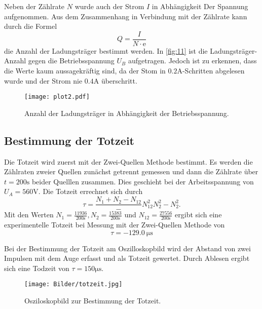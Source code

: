 \noindent Neben der Zählrate $N$ wurde auch der Strom $I$ in Abhängigkeit 
Der Spannung aufgenommen. Aus dem Zusammenhang in Verbindung 
mit der Zählrate kann durch die Formel 
\begin{equation}
    Q = \frac{I}{N \cdot \text{e}}
\end{equation}
die Anzahl der Ladungsträger bestimmt werden. In \autoref{fig:11} ist die 
Ladungsträger-Anzahl gegen die Betriebsspannung $U_B$ aufgetragen. Jedoch ist 
zu erkennen, dass die Werte kaum aussagekräftig sind, da der Stom 
in $0.2 \unit{\ampere}$-Schritten abgelesen wurde und der Strom 
nie $0.4 \unit{\ampere}$ überschritt.
\begin{figure}[H]
    \centering
    \caption{Anzahl der Ladungsträger in Abhängigkeit der Betriebsspannung.}
    \label{fig:11}
    \texttt{[image: plot2.pdf]}
\end{figure}

\subsection{Bestimmung der Totzeit}
Die Totzeit wird zuerst mit der Zwei-Quellen Methode bestimmt. Es 
werden die Zählraten zweier Quellen zunächst getrennt gemessen und 
dann die Zählrate über $t = 200 \unit{\second}$ beider Quelllen zusammen. Dies
geschieht bei der Arbeitsspannung von $U_A = 560 \unit{\volt}$. Die Totzeit
errechnet sich durch
\begin{equation}
    \tau = \frac{N_\text{1} + N_\text{2} - N_\text{12}}-{N_\text{12}^2  N_\text{2}^2 - N_\text{2}^2}.
\end{equation}
Mit den Werten $N_\text{1} = \frac{11936}{200\unit{\second}} , N_\text{2} =
\frac{15383}{200\unit{\second}} $ und $ N_\text{12} =
\frac{27556}{200\unit{\second}}$ ergibt sich eine 
experimentelle Totzeit bei Messung mit der Zwei-Quellen Methode von 
\begin{equation}
    \tau = \qty{-129.0}{\micro\second} 
\end{equation}

Bei der Bestimmung der Totzeit am Oszilloskopbild wird der Abstand von zwei
Impulsen mit dem Auge erfasst und als Totzeit gewertet. Durch Ablesen ergibt
sich eine Todzeit von $\tau = 150 \unit{\micro\second}$.
\begin{figure}[H]
    \centering
    \caption{Osziloskopbild zur Bestimmung der Totzeit.}
    \label{fig:12}
    \texttt{[image: Bilder/totzeit.jpg]}
\end{figure} 

